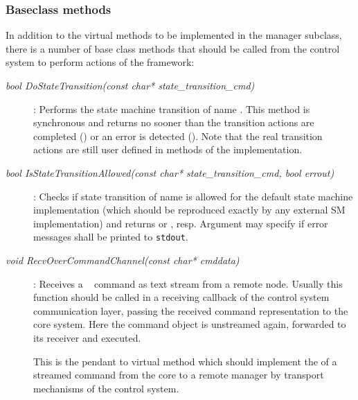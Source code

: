 \subsubsection{Baseclass methods}
\label{prog_manager_controls_base}
In addition to the virtual methods to be implemented in the manager subclass,
there is a number of  base class methods 
that should be called from the control system to perform actions of the 
framework:

\begin{description}

 
\item[\em bool DoStateTransition(const char* state\_transition\_cmd)] :
Performs the state machine transition of name .
This method is synchronous and returns no sooner than the 
transition actions are completed () or an error is detected ().
Note that the real transition actions are still user defined in methods
of the  implementation.

\item[\em bool IsStateTransitionAllowed(const char* state\_transition\_cmd, bool errout)] :
Checks if state transition of name  is allowed
for the default state machine implementation (which should be reproduced exactly by
any external SM implementation) and returns  or , resp. Argument
 may specify if error messages shall be printed to {\tt stdout}.

\item[\em void RecvOverCommandChannel(const char* cmddata)] :
Receives a \dabc~ command as text stream  
from a remote node. Usually this function should be called in a
receiving callback of the control system communication layer,
passing the received command representation to the core system.
Here the command object is unstreamed again, forwarded to its
receiver and executed.

This is the pendant to virtual method 
 which should implement the  
of a streamed command from the core to a remote manager by transport mechanisms of the control system. 

 
 
\end{description}






